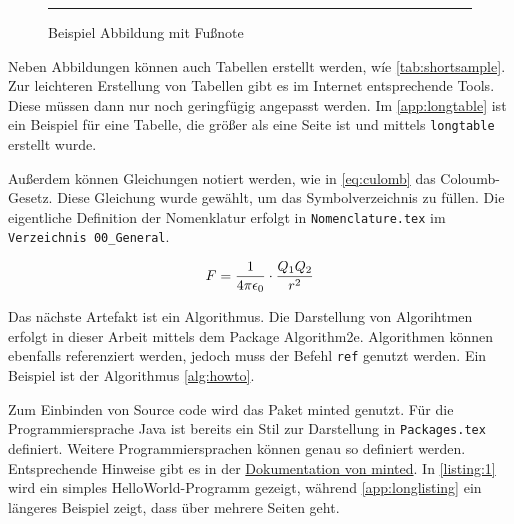 \begin{figure}[h]
\centering
\rule{.5\textwidth}{1cm}
\caption[{Beispiel Abbildung}]{Beispiel Abbildung mit Fußnote\protect\footnotemark}
\label{fig:example}
\end{figure}

Neben Abbildungen können auch Tabellen erstellt werden, wíe \cref{tab:shortsample}. 
Zur leichteren Erstellung von Tabellen gibt es im Internet entsprechende Tools. 
Diese müssen dann nur noch geringfügig angepasst werden. 
Im \cref{app:longtable} ist ein Beispiel für eine Tabelle, die größer als eine Seite ist und mittels \texttt{longtable} erstellt wurde.



Außerdem können Gleichungen notiert werden, wie in \cref{eq:culomb} das Coloumb-Gesetz.
Diese Gleichung wurde gewählt, um das Symbolverzeichnis zu füllen. 
Die eigentliche Definition der Nomenklatur erfolgt in \texttt{Nomenclature.tex} im \texttt{Verzeichnis 00\_General}.

\begin{equation}
    \label{eq:culomb}
    \equationentry{Coulomb-Gesetz}
    F = \frac{1}{4\pi\epsilon_0}\cdot\frac{Q_1Q_2}{r^2}
\end{equation}

Das nächste Artefakt ist ein Algorithmus.
Die Darstellung von Algorihtmen erfolgt in dieser Arbeit mittels dem Package Algorithm2e.
Algorithmen können ebenfalls referenziert werden, jedoch muss der Befehl \texttt{ref} genutzt werden.
Ein Beispiel ist der Algorithmus \ref{alg:howto}.



Zum Einbinden von Source code wird das Paket minted genutzt. 
Für die Programmiersprache Java ist bereits ein Stil zur Darstellung in \texttt{Packages.tex} definiert.
Weitere Programmiersprachen können genau so definiert werden. Entsprechende Hinweise gibt es in der 
\href{https://www.ctan.org/pkg/minted}{Dokumentation von minted}.
In \cref{listing:1} wird ein simples HelloWorld-Programm gezeigt, während \cref{app:longlisting} ein längeres Beispiel zeigt, dass über mehrere Seiten geht.

\begin{listing}[h]
\caption{Hello World Example in Java}
\label{listing:1}
\inputminted{java}{04_Artifacts/03_Listings/HelloWorld.java}
\end{listing}

\blinddocument


